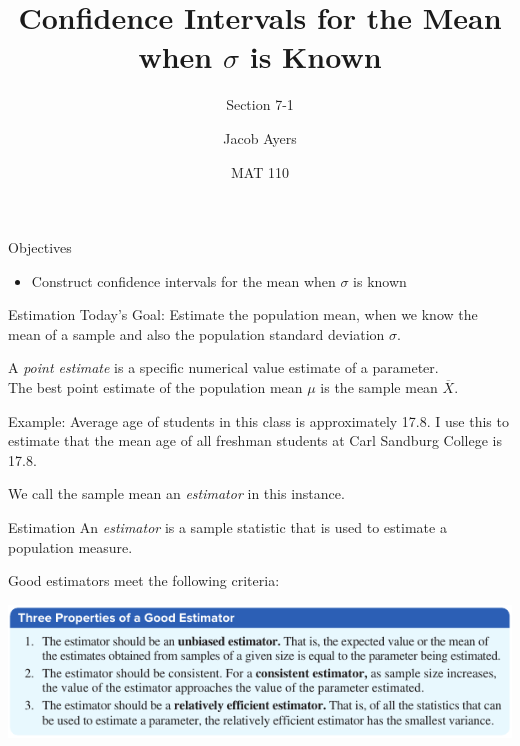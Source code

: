 \documentclass[t, aspectratio=169]{beamer}
\title[7-1]{Confidence Intervals for the Mean when $\sigma$ is Known}
\subtitle{Section 7-1}
\author{Jacob Ayers}
\institute{Lesson \#20}
\date{MAT 110}
\newcommand{\?}{\stackrel{?}{=}}
\begin{document}
	
	\begin{frame}
		\titlepage
	\end{frame}
	
	\begin{frame}{Objectives}
		\begin{itemize}
			\item Construct confidence intervals for the mean when $\sigma$ is known
		\end{itemize}
	\end{frame}

	\begin{frame}{Estimation}
		Today's Goal: Estimate the population mean, when we know the mean of a sample and also the population standard deviation $\sigma$. \pause
		
		A \textit{point estimate} is a specific numerical value estimate of a parameter. \pause \\
		The best point estimate of the population mean $\mu$ is the sample mean $\overline{X}$.
		
		Example: Average age of students in this class is approximately 17.8. I use this to estimate that the mean age of all freshman students at Carl Sandburg College is 17.8.
		
		We call the sample mean an \textit{estimator} in this instance.
	\end{frame}

	\begin{frame}{Estimation}
		An \textit{estimator} is a sample statistic that is used to estimate a population measure. \pause
		
		Good estimators meet the following criteria: \pause
		
		\includegraphics[width=\textwidth]{good-estimator.png}
	\end{frame}
\end{document}
